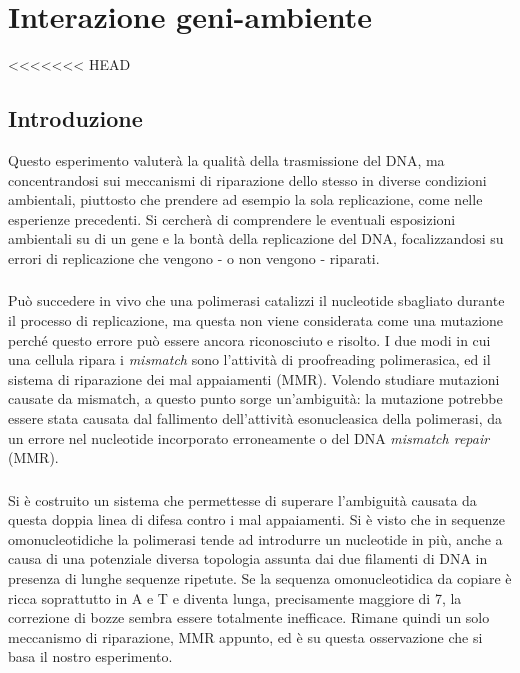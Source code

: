 \section*{Interazione geni-ambiente}
<<<<<<< HEAD
 \subsection{Introduzione}
 Questo esperimento valuterà la qualità della trasmissione del DNA, ma concentrandosi sui meccanismi di riparazione dello stesso in diverse condizioni ambientali, piuttosto che prendere ad esempio la sola replicazione, come nelle esperienze precedenti. Si cercherà di comprendere le eventuali esposizioni ambientali su di un gene e la bontà della replicazione del DNA, focalizzandosi su errori di replicazione che vengono - o non vengono - riparati. 
 
 \subsubsection{}
 Può succedere in vivo che una polimerasi catalizzi il nucleotide sbagliato durante il processo di replicazione, ma questa non viene considerata come una mutazione perché questo errore può essere ancora riconosciuto e risolto. I due modi in cui una cellula ripara i \textit{mismatch} sono l'attività di proofreading polimerasica, ed il sistema di riparazione dei mal appaiamenti (MMR). Volendo studiare mutazioni causate da mismatch, a questo punto sorge un'ambiguità: la mutazione potrebbe essere stata causata dal fallimento dell'attività esonucleasica della polimerasi, da un errore nel nucleotide incorporato erroneamente o del DNA \textit{mismatch repair} (MMR). 
 
 \subsubsection{}
 Si è costruito un sistema che permettesse di superare l'ambiguità causata da questa doppia linea di difesa contro i mal appaiamenti. Si è visto che in sequenze omonucleotidiche la polimerasi tende ad introdurre un nucleotide in più, anche a causa di una potenziale diversa topologia assunta dai due filamenti di DNA in presenza di lunghe sequenze ripetute. Se la sequenza omonucleotidica da copiare è ricca soprattutto in A e T e diventa lunga, precisamente maggiore di 7, la correzione di bozze sembra essere totalmente inefficace. Rimane quindi un solo meccanismo di riparazione, MMR appunto, ed è su questa osservazione che si basa il nostro esperimento. 
 
